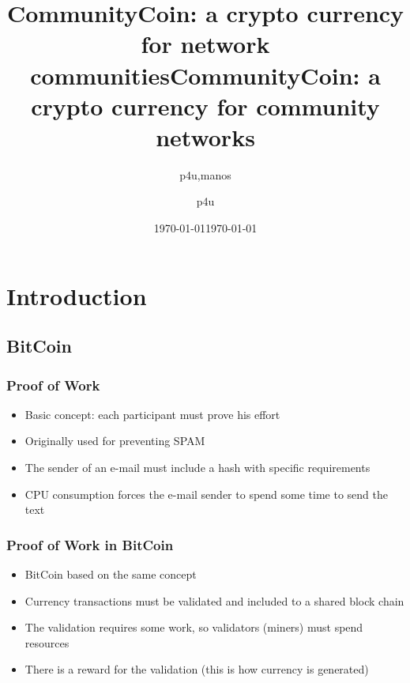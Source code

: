 \documentclass[usepdftitle=false,13pt]{beamer}
\title[CommunityCoin: a crypto currency for network communities]{CommunityCoin: a crypto currency for network communities}
\author[{p4u,manos}]{p4u,manos}
\institute[{guifi.net,upc}]{guifi.net,upc}
\date[\today]{\today}
\begin{document}
\title[CommunityCoin\hspace{20em}\insertframenumber/\inserttotalframenumber]{CommunityCoin: a crypto currency for community networks}  
\author[p4u]{ p4u\\
 }

\date{\today} 

\frame{\titlepage}




\section{Introduction}
\subsection{BitCoin}



\begin{frame}\frametitle{Proof of Work}
	\begin{itemize}
		\item Basic concept: each participant must prove his effort
		
		\item Originally used for preventing SPAM 
		
		\item  The sender of an e-mail must include a hash with specific requirements
	
		\item CPU consumption forces the e-mail sender to spend some time to send the text
	\end{itemize}
\end{frame}

\begin{frame}\frametitle{Proof of Work in BitCoin}
	\begin{itemize}
		\item BitCoin based on the same concept
		\item Currency transactions must be validated and included to a shared block chain
		\item The validation requires some work, so validators (miners) must spend resources
		\item There is a reward for the validation (this is how currency is generated)
	\end{itemize}
\end{frame}
\end{document}
